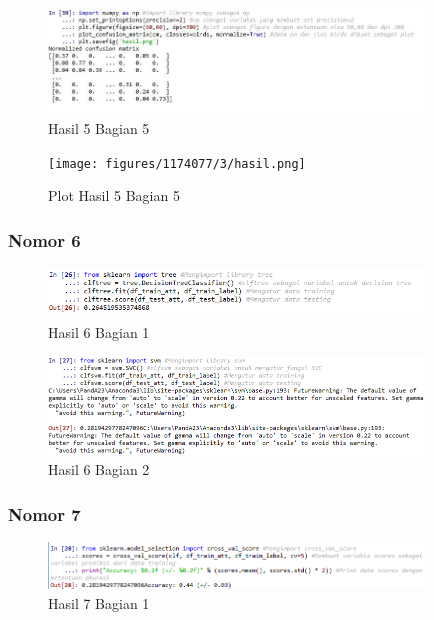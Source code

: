 
\begin{figure}[H]
\centerline{\includegraphics[width=10cm]{figures/1174077/3/36.png}}
\caption{Hasil 5 Bagian 5}
\label{labelgambar}
\end{figure}

\begin{figure}[H]
\centerline{\texttt{[image: figures/1174077/3/hasil.png]}}
\caption{Plot Hasil 5 Bagian 5}
\label{labelgambar}
\end{figure}

\subsubsection{Nomor 6}
\hfill\break

\begin{figure}[H]
\centerline{\includegraphics[width=10cm]{figures/1174077/3/29.png}}
\caption{Hasil 6 Bagian 1}
\label{labelgambar}
\end{figure}


\begin{figure}[H]
\centerline{\includegraphics[width=10cm]{figures/1174077/3/30.png}}
\caption{Hasil 6 Bagian 2}
\label{labelgambar}
\end{figure}

\subsubsection{Nomor 7}
\hfill\break

\begin{figure}[H]
\centerline{\includegraphics[width=10cm]{figures/1174077/3/31.png}}
\caption{Hasil 7 Bagian 1}
\label{labelgambar}
\end{figure}

